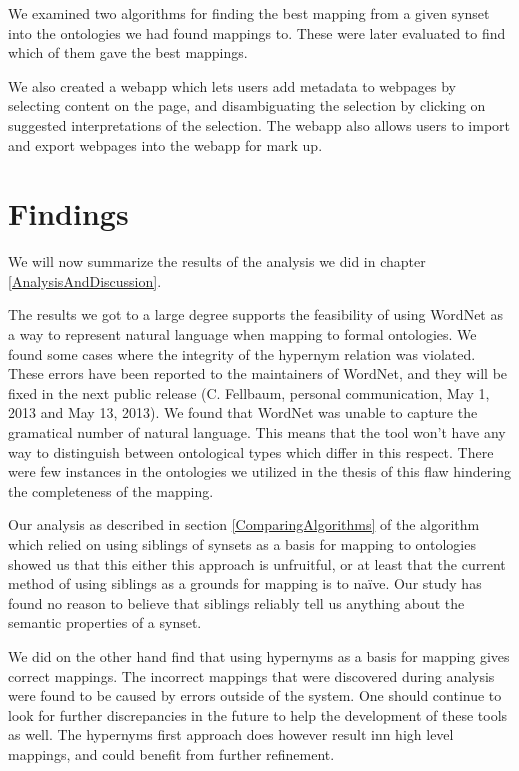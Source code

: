 We examined two algorithms for finding the best mapping from a given synset into the ontologies we had found mappings to.
These were later evaluated to find which of them gave the best mappings.

We also created a webapp which lets users add metadata to webpages by selecting content on the page,
and disambiguating the selection by clicking on suggested interpretations of the selection.
The webapp also allows users to import and export webpages into the webapp for mark up.

\section{Findings}
We will now summarize the results of the analysis we did in chapter \ref{AnalysisAndDiscussion}.

The results we got to a large degree supports the feasibility of using WordNet as a way to represent natural language
when mapping to formal ontologies.
We found some cases where the integrity of the hypernym relation was violated.
These errors have been reported to the maintainers of WordNet, and they will be fixed in the next public  release (C. Fellbaum, personal communication, May 1, 2013 and May 13, 2013).
We found that WordNet was unable to capture the gramatical number of natural language.
This means that the tool won't have any way to distinguish between ontological types which differ in this respect.
There were few instances in the ontologies we utilized in the thesis of this flaw hindering the completeness of the mapping.

Our analysis as described in section \ref{ComparingAlgorithms} of the algorithm which relied on
using siblings of synsets as a basis for mapping to ontologies showed us that this either this approach is unfruitful,
or at least that the current method of using siblings as a grounds for mapping is to naïve.
Our study has found no reason to believe that siblings reliably tell us anything about the semantic properties of a synset.

We did on the other hand find that using hypernyms as a basis for mapping gives correct mappings.
The incorrect mappings that were discovered during analysis were found to be caused by errors outside of the system.
One should continue to look for further discrepancies in the future to help the development of these tools as well.
The hypernyms first approach does however result inn high level mappings, and could benefit from further refinement.

